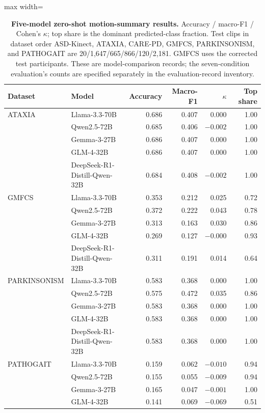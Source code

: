 \begin{table}[H]
\centering
\caption{\textbf{Five-model zero-shot motion-summary results.} Accuracy / macro-F1 / Cohen's $\kappa$; top share is the dominant predicted-class fraction. Test clips in dataset order ASD-Kinect, ATAXIA, CARE-PD, GMFCS, PARKINSONISM, and PATHOGAIT are 20/1,647/665/866/120/2,181. GMFCS uses the corrected test participants. These are model-comparison records; the seven-condition evaluation's counts are specified separately in the evaluation-record inventory.}
\label{tab:primary_five_family}
\scriptsize
\begin{adjustbox}{max width=\textwidth}
\begin{tabular}{llrrrr}
\toprule
Dataset & Model & Accuracy & Macro-F1 & $\kappa$ & Top share \\
\midrule
ATAXIA & Llama-3.3-70B & 0.686 & 0.407 & 0.000 & 1.00 \\
& Qwen2.5-72B & 0.685 & 0.406 & $-0.002$ & 1.00 \\
& Gemma-3-27B & 0.686 & 0.407 & 0.000 & 1.00 \\
& GLM-4-32B & 0.686 & 0.407 & 0.000 & 1.00 \\
& DeepSeek-R1-Distill-Qwen-32B & 0.684 & 0.408 & $-0.002$ & 1.00 \\
\addlinespace
GMFCS & Llama-3.3-70B & 0.353 & 0.212 & 0.025 & 0.72 \\
& Qwen2.5-72B & 0.372 & 0.222 & 0.043 & 0.78 \\
& Gemma-3-27B & 0.313 & 0.163 & 0.030 & 0.86 \\
& GLM-4-32B & 0.269 & 0.127 & $-0.000$ & 0.93 \\
& DeepSeek-R1-Distill-Qwen-32B & 0.311 & 0.191 & 0.014 & 0.64 \\
\addlinespace
PARKINSONISM & Llama-3.3-70B & 0.583 & 0.368 & 0.000 & 1.00 \\
& Qwen2.5-72B & 0.575 & 0.472 & 0.035 & 0.86 \\
& Gemma-3-27B & 0.583 & 0.368 & 0.000 & 1.00 \\
& GLM-4-32B & 0.583 & 0.368 & 0.000 & 1.00 \\
& DeepSeek-R1-Distill-Qwen-32B & 0.583 & 0.368 & 0.000 & 1.00 \\
\addlinespace
PATHOGAIT & Llama-3.3-70B & 0.159 & 0.062 & $-0.010$ & 0.94 \\
& Qwen2.5-72B & 0.155 & 0.055 & $-0.009$ & 0.94 \\
& Gemma-3-27B & 0.165 & 0.047 & $-0.001$ & 1.00 \\
& GLM-4-32B & 0.141 & 0.069 & $-0.069$ & 0.51 \\

\end{tabular}
\end{adjustbox}
\end{table}
